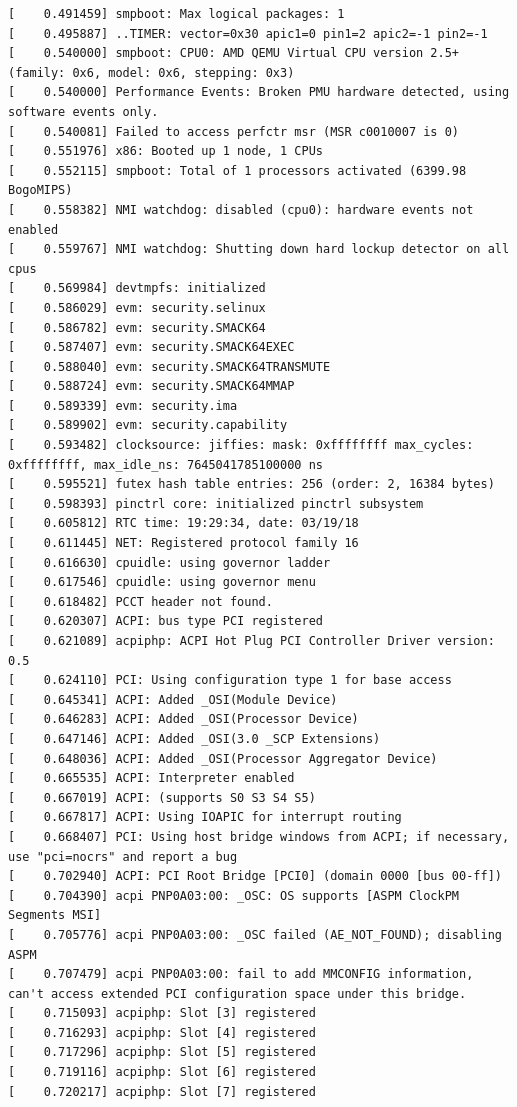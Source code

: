 \documentclass[12pt]{article}
\begin{document}
\begin{verbatim}
[    0.491459] smpboot: Max logical packages: 1
[    0.495887] ..TIMER: vector=0x30 apic1=0 pin1=2 apic2=-1 pin2=-1
[    0.540000] smpboot: CPU0: AMD QEMU Virtual CPU version 2.5+ (family: 0x6, model: 0x6, stepping: 0x3)
[    0.540000] Performance Events: Broken PMU hardware detected, using software events only.
[    0.540081] Failed to access perfctr msr (MSR c0010007 is 0)
[    0.551976] x86: Booted up 1 node, 1 CPUs
[    0.552115] smpboot: Total of 1 processors activated (6399.98 BogoMIPS)
[    0.558382] NMI watchdog: disabled (cpu0): hardware events not enabled
[    0.559767] NMI watchdog: Shutting down hard lockup detector on all cpus
[    0.569984] devtmpfs: initialized
[    0.586029] evm: security.selinux
[    0.586782] evm: security.SMACK64
[    0.587407] evm: security.SMACK64EXEC
[    0.588040] evm: security.SMACK64TRANSMUTE
[    0.588724] evm: security.SMACK64MMAP
[    0.589339] evm: security.ima
[    0.589902] evm: security.capability
[    0.593482] clocksource: jiffies: mask: 0xffffffff max_cycles: 0xffffffff, max_idle_ns: 7645041785100000 ns
[    0.595521] futex hash table entries: 256 (order: 2, 16384 bytes)
[    0.598393] pinctrl core: initialized pinctrl subsystem
[    0.605812] RTC time: 19:29:34, date: 03/19/18
[    0.611445] NET: Registered protocol family 16
[    0.616630] cpuidle: using governor ladder
[    0.617546] cpuidle: using governor menu
[    0.618482] PCCT header not found.
[    0.620307] ACPI: bus type PCI registered
[    0.621089] acpiphp: ACPI Hot Plug PCI Controller Driver version: 0.5
[    0.624110] PCI: Using configuration type 1 for base access
[    0.645341] ACPI: Added _OSI(Module Device)
[    0.646283] ACPI: Added _OSI(Processor Device)
[    0.647146] ACPI: Added _OSI(3.0 _SCP Extensions)
[    0.648036] ACPI: Added _OSI(Processor Aggregator Device)
[    0.665535] ACPI: Interpreter enabled
[    0.667019] ACPI: (supports S0 S3 S4 S5)
[    0.667817] ACPI: Using IOAPIC for interrupt routing
[    0.668407] PCI: Using host bridge windows from ACPI; if necessary, use "pci=nocrs" and report a bug
[    0.702940] ACPI: PCI Root Bridge [PCI0] (domain 0000 [bus 00-ff])
[    0.704390] acpi PNP0A03:00: _OSC: OS supports [ASPM ClockPM Segments MSI]
[    0.705776] acpi PNP0A03:00: _OSC failed (AE_NOT_FOUND); disabling ASPM
[    0.707479] acpi PNP0A03:00: fail to add MMCONFIG information, can't access extended PCI configuration space under this bridge.
[    0.715093] acpiphp: Slot [3] registered
[    0.716293] acpiphp: Slot [4] registered
[    0.717296] acpiphp: Slot [5] registered
[    0.719116] acpiphp: Slot [6] registered
[    0.720217] acpiphp: Slot [7] registered

\end{verbatim}
\end{document}
